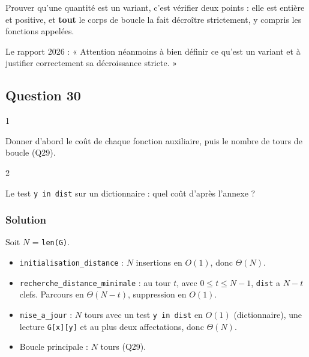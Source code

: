 \documentclass[11pt,a4paper]{article}
\providecommand{\tightlist}{\setlength{\itemsep}{0pt}\setlength{\parskip}{0pt}}
\begin{document}
\begin{methode}

Prouver qu'une quantité est un variant, c'est vérifier deux points : elle est entière et positive, et \textbf{tout} le corps de boucle la fait décroître strictement, y compris les fonctions appelées.

\end{methode}

\begin{jury}

Le rapport 2026 : « Attention néanmoins à bien définir ce qu'est un variant et à justifier correctement sa décroissance stricte. »

\end{jury}

\hypertarget{question-30}{%
\subsection{Question 30}\label{question-30}}

\begin{indication}{1}

Donner d'abord le coût de chaque fonction auxiliaire, puis le nombre de tours de boucle (Q29).

\end{indication}

\begin{indication}{2}

Le test \texttt{y\ in\ dist} sur un dictionnaire : quel coût d'après l'annexe ?

\end{indication}

\hypertarget{solution-29}{%
\subsubsection{Solution}\label{solution-29}}

Soit \(N\) = \texttt{len(G)}.

\begin{itemize}
\tightlist
\item
  \texttt{initialisation\_distance} : \(N\) insertions en \(O(1)\), donc \(\Theta(N)\).
\item
  \texttt{recherche\_distance\_minimale} : au tour \(t\), avec \(0 \leqslant t \leqslant N-1\), \texttt{dist} a \(N - t\) clefs. Parcours en \(\Theta(N - t)\), suppression en \(O(1)\).
\item
  \texttt{mise\_a\_jour} : \(N\) tours avec un test \texttt{y\ in\ dist} en \(O(1)\) (dictionnaire), une lecture \texttt{G{[}x{]}{[}y{]}} et au plus deux affectations, donc \(\Theta(N)\).
\item
  Boucle principale : \(N\) tours (Q29).
\end{itemize}
\end{document}
